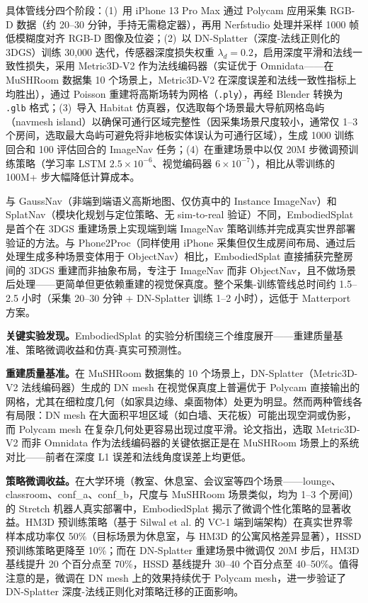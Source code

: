 具体管线分四个阶段：(1)~用 iPhone 13 Pro Max 通过 Polycam 应用采集 RGB-D 数据（约 20--30 分钟，手持无需稳定器），再用 Nerfstudio 处理并采样 1000 帧低模糊度对齐 RGB-D 图像及位姿；(2)~以 DN-Splatter（深度-法线正则化的 3DGS）训练 30{,}000 迭代，传感器深度损失权重 $\lambda_d = 0.2$，启用深度平滑和法线一致性损失，采用 Metric3D-V2 作为法线编码器（实证优于 Omnidata——在 MuSHRoom 数据集 10 个场景上，Metric3D-V2 在深度误差和法线一致性指标上均胜出），通过 Poisson 重建将高斯场转为网格（\texttt{.ply}），再经 Blender 转换为 \texttt{.glb} 格式；(3)~导入 Habitat 仿真器，仅选取每个场景最大导航网格岛屿（navmesh island）以确保可通行区域完整性（因采集场景尺度较小，通常仅 1--3 个房间，选取最大岛屿可避免将非地板实体误认为可通行区域），生成 1000 训练回合和 100 评估回合的 ImageNav 任务；(4)~在重建场景中以仅 20M 步微调预训练策略（学习率 LSTM $2.5\times10^{-6}$、视觉编码器 $6\times10^{-7}$），相比从零训练的 100M+ 步大幅降低计算成本。

与 GaussNav（非端到端语义高斯地图、仅仿真中的 Instance ImageNav）和 SplatNav（模块化规划与定位策略、无 sim-to-real 验证）不同，EmbodiedSplat 是首个在 3DGS 重建场景上实现端到端 ImageNav 策略训练并完成真实世界部署验证的方法。与 Phone2Proc（同样使用 iPhone 采集但仅生成房间布局、通过后处理生成多种场景变体用于 ObjectNav）相比，EmbodiedSplat 直接捕获完整房间的 3DGS 重建而非抽象布局，专注于 ImageNav 而非 ObjectNav，且不做场景后处理——更简单但更依赖重建的视觉保真度。整个采集-训练管线总时间约 1.5--2.5 小时（采集 20--30 分钟 + DN-Splatter 训练 1--2 小时），远低于 Matterport 方案。

\textbf{关键实验发现。}EmbodiedSplat 的实验分析围绕三个维度展开——重建质量基准、策略微调收益和仿真-真实可预测性。

\textbf{重建质量基准。}在 MuSHRoom 数据集的 10 个场景上，DN-Splatter（Metric3D-V2 法线编码器）生成的 DN mesh 在视觉保真度上普遍优于 Polycam 直接输出的网格，尤其在细粒度几何（如家具边缘、桌面物体）处更为明显。然而两种管线各有局限：DN mesh 在大面积平坦区域（如白墙、天花板）可能出现空洞或伪影，而 Polycam mesh 在复杂几何处更容易出现过度平滑。论文指出，选取 Metric3D-V2 而非 Omnidata 作为法线编码器的关键依据正是在 MuSHRoom 场景上的系统对比——前者在深度 L1 误差和法线角度误差上均更低。

\textbf{策略微调收益。}在大学环境（教室、休息室、会议室等四个场景——lounge、classroom、conf\_a、conf\_b，尺度与 MuSHRoom 场景类似，均为 1--3 个房间）的 Stretch 机器人真实部署中，EmbodiedSplat 揭示了微调个性化策略的显著收益。HM3D 预训练策略（基于 Silwal et al. 的 VC-1 端到端架构）在真实世界零样本成功率仅 50\%（目标场景为休息室，与 HM3D 的公寓风格差异显著），HSSD 预训练策略更降至 10\%；而在 DN-Splatter 重建场景中微调仅 20M 步后，HM3D 基线提升 20 个百分点至 70\%，HSSD 基线提升 30--40 个百分点至 40--50\%。值得注意的是，微调在 DN mesh 上的效果持续优于 Polycam mesh，进一步验证了 DN-Splatter 深度-法线正则化对策略迁移的正面影响。

